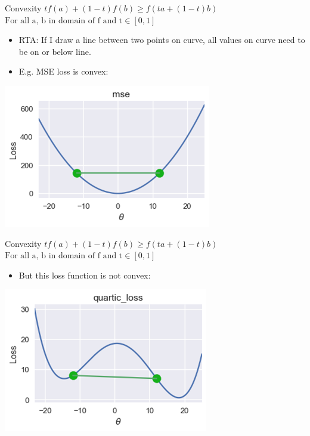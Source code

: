 \documentclass[aspectratio=169]{../latex_main/tntbeamer}  %
\begin{document}
	
	\begin{frame}{Convexity}
	        \hspace{4cm}$tf(a)+(1-t)f(b)\geq f(ta + (1 - t)b)$\\
	        \hspace{4cm} $\text{For all a, b in domain of f and t} \in [0,1]$
	    \begin{itemize}
	        \item RTA: If I draw a line between two points on curve, all values on curve need to be on or below line.
	        \item E.g. MSE loss is convex:
	    \end{itemize}
	    \hspace{5cm}
	    \includegraphics[scale=.4]{Bild7}
	\end{frame}
	
	
	\begin{frame}{Convexity}
	        \hspace{4cm}$tf(a)+(1-t)f(b)\geq f(ta + (1 - t)b)$\\
	        \hspace{4cm} $\text{For all a, b in domain of f and t} \in [0,1]$
	    \begin{itemize}
	        \item But this loss function is not convex:
	    \end{itemize}
	    \hspace{3.5cm}
	    \includegraphics[scale=.5]{Bild8}
	\end{frame}
	
\end{document}
